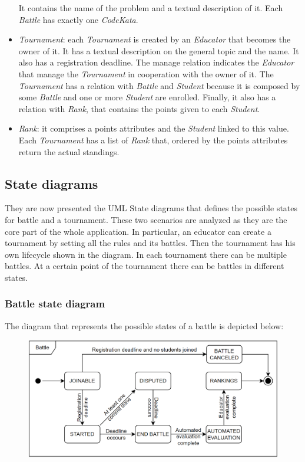 \documentclass[12pt, a4paper]{report}
\begin{document}
\begin{itemize}
            It contains the name of the problem and a textual description of it. 
            Each \textit{Battle} has exactly one \textit{CodeKata}. 
        \item \textit{Tournament}: each \textit{Tournament} is created by an \textit{Educator} that becomes the owner of it. 
            It has a textual description on the general topic and the name. 
            It also has a registration deadline. 
            The manage relation indicates the \textit{Educator} that manage the \textit{Tournament} in cooperation with the owner of it. 
            The \textit{Tournament} has a relation with \textit{Battle} and \textit{Student} because it is composed by some \textit{Battle} and one or more \textit{Student} are enrolled. 
            Finally, it also has a relation with \textit{Rank}, that contains the points given to each \textit{Student}.
        \item \textit{Rank}: it comprises a points attributes and the \textit{Student} linked to this value. 
            Each \textit{Tournament} has a list of \textit{Rank} that, ordered by the points attributes return the actual standings. 
    \end{itemize}

    \subsection{State diagrams}
    They are now presented the UML State diagrams that defines the possible states for battle and a tournament. 
    These two scenarios are analyzed as they are the core part of the whole application.
    In particular, an educator can create a tournament by setting all the rules and its battles. 
    Then the tournament has his own lifecycle shown in the diagram. 
    In each tournament there can be multiple battles. 
    At a certain point of the tournament there can be battles in different states. 
    
    \subsubsection{Battle state diagram}
    The diagram that represents the possible states of a battle is depicted below: 
    \begin{figure}[H]
        \centering
        \includegraphics[width=0.75\linewidth]{images/battle.png}
    \end{figure}
\end{document}
